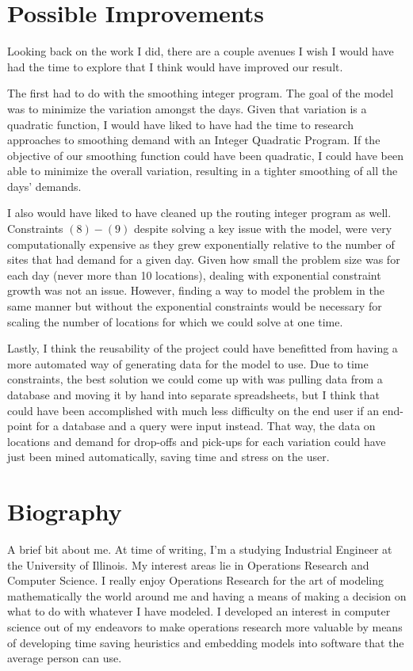 \documentclass[letterpaper,10pt,english]{sphinxmanual}
\begin{document}
\section{Possible Improvements}
\label{\detokenize{conclusion:possible-improvements}}
Looking back on the work I did, there are a couple avenues I wish I would
have had the time to explore that I think would have improved our result.

The first had to do with the smoothing integer program. The goal of the model
was to minimize the variation amongst the days. Given that variation is a
quadratic function, I would have liked to have had the time to research
approaches to smoothing demand with an Integer Quadratic Program. If the
objective of our smoothing function could have been quadratic, I could have
been able to minimize the overall variation, resulting in a tighter smoothing
of all the days' demands.

I also would have liked to have cleaned up the routing integer program as
well. Constraints \((8)-(9)\) despite solving a key issue with the model,
were very computationally expensive as they grew exponentially relative to
the number of sites that had demand for a given day. Given how small the
problem size was for each day (never more than 10 locations), dealing with
exponential constraint growth was not an issue. However, finding a way to
model the problem in the same manner but without the exponential constraints
would be necessary for scaling the number of locations for which we could
solve at one time.

Lastly, I think the reusability of the project could have benefitted from
having a more automated way of generating data for the model to use. Due to
time constraints, the best solution we could come up with was pulling data
from a database and moving it by hand into separate spreadsheets, but I
think that could have been accomplished with much less difficulty on the end
user if an end-point for a database and a query were input instead. That way,
the data on locations and demand for drop-offs and pick-ups for each
variation could have just been mined automatically, saving time and stress on
the user.


\section{Biography}
\label{\detokenize{conclusion:biography}}
A brief bit about me. At time of writing, I'm a studying Industrial Engineer
at the University of Illinois. My interest areas lie in Operations Research
and Computer Science. I really enjoy Operations Research for the art of
modeling mathematically the world around me and having a means of making a
decision on what to do with whatever I have modeled. I developed an interest
in computer science out of my endeavors to make operations research more
valuable by means of developing time saving heuristics and embedding models
into software that the average person can use.
\end{document}
